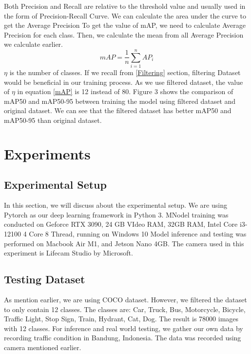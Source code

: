 \documentclass[conference]{IEEEtran}
\begin{document}
Both Precision and Recall are relative to the threshold value and usually used in the form of Precision-Recall Curve. We can calculate the area under the curve to get the Average Precision
To get the value of mAP, we need to calculate Average Precision for each class. Then, we calculate the mean from all Average Precision we calculate earlier.
\begin{equation}
mAP = \frac{1}{n}\sum_{i=1}^{n}AP_i
\label{mAP}
\end{equation}
$\eta$ is the number of classes.
If we recall from \ref{Filtering} section, filtering Dataset would be beneficial in our training process. As we use filtered dataset, the value of $\eta$ in equation \ref{mAP} is 12 instead of 80.
Figure 3 shows the comparison of mAP50 and mAP50-95 between training the model using filtered dataset and original dataset. We can see that the filtered dataset has better mAP50 and mAP50-95 than original dataset.

\section{Experiments}


\subsection{Experimental Setup}
In this section, we will discuss about the experimental setup. We are using Pytorch as our deep learning framework in Python  3.
MNodel training was conducted on Geforce RTX 3090, 24 GB VIdeo RAM, 32GB RAM, Intel Core i3-12100 4 Core 8 Thread, running on Windows 10
Model inference and testing was performed on Macbook Air M1, and Jetson Nano 4GB. The camera used in this experiment is Lifecam Studio by Microsoft.

\subsection{Testing Dataset}
As mention earlier, we are using COCO dataset. However, we filtered the dataset to only contain 12 classes. The classes are:
Car, Truck, Bus, Motorcycle, Bicycle, Traffic Light, Stop Sign, Train, Hydrant, Cat, Dog. The result is 78000 images with 12 classes.
For inference and real world testing, we gather our own data by recording traffic condition in Bandung, Indonesia. The data was recorded using camera mentioned earlier.
\end{document}
